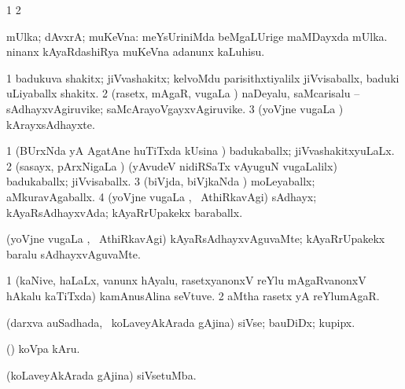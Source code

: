 {{{{\bentry
{}
\gl{\saMkiSx}
\expl{}
\bmng
\bnum
\num{1}  
\num{2}  
\enum
\emng
\eentry

\bentry
{}
\gl{\saMkiSx}
\expl{}
\bmng
\emng
\eentry

\bentry
{}
\gl{\saMkiSx}
\expl{}
\bmng
\emng
\eentry

\bentry
{} 
\gl{\upa}
\expl{}
\bmng
 mUlka; dAvxrA; muKeVna:  meYsUriniMda beMgaLUrige maMDayxda mUlka.  ninanx kAyaRdashiRya muKeVna adanunx kaLuhisu. 
\emng
\eentry

\bentry
{} 
\gl{\nA}
\expl{}
\bmng
\bnum
\num{1} badukuva shakitx; jiVvashakitx; kelvoMdu parisithxtiyalilx jiVvisaballx, baduki uLiyaballx shakitx. 
\num{2} (rasetx, mAgaR, \mo vugaLa \vi) naDeyalu, saMcarisalu -- sAdhayxvAgiruvike; saMcArayoVgayxvAgiruvike. 
\num{3} (yoVjne \mo vugaLa \vi) kArayxsAdhayxte. 
\enum
\emng
\eentry

\bentry
{} 
\gl{\gu}
\expl{}
\bmng
\bnum
\num{1} (BUrxNda yA AgatAne huTiTxda kUsina \vi) badukaballx; jiVvashakitxyuLaLx. 
\num{2} (sasayx, pArxNigaLa \vi) (yAvudeV nidiRSaTx vAyuguN \mo vugaLalilx) badukaballx; jiVvisaballx. 
\num{3} (biVjda, biVjkaNda \vi) moLeyaballx; aMkuravAgaballx. 
\num{4} (yoVjne \mo vugaLa \vi, \kanmu\ AthiRkavAgi) sAdhayx; kAyaRsAdhayxvAda; kAyaRrUpakekx baraballx. 
\enum
\emng
\eentry

\bentry
{} 
\gl{\kirxvi}
\expl{}
\bmng
 (yoVjne \mo vugaLa \vi, \kanmu\ AthiRkavAgi) kAyaRsAdhayxvAguvaMte; kAyaRrUpakekx baralu sAdhayxvAguvaMte. 
\emng
\eentry

\bentry
{} 
\gl{\nA}
\expl{}
\bmng
\bnum
\num{1} (kaNive, haLaLx, \mo vanunx hAyalu, rasetxyanonxV reYlu mAgaRvanonxV hAkalu kaTiTxda) kamAnusAlina seVtuve. 
\num{2} aMtha rasetx yA reYlumAgaR. 
\enum
\emng
\eentry

\bentry
{} 
\gl{\nA}
\expl{}
\bmng
 (darxva auSadhada, \sA\ koLaveyAkArada gAjina) siVse; bauDiDx; kupipx. 
\emng

\noindent
\gl{\pagu}
\bmng
{} (\AmA) koVpa kAru. 
\emng
\eentry

\bentry
{} 
\gl{\nA}
\bmng
 (koLaveyAkArada gAjina) siVsetuMba. 
\emng
\eentry

}}}}

